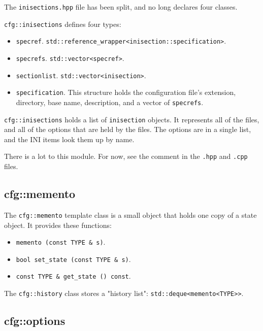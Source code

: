    The \texttt{inisections.hpp} file has been split,
   and no long declares four classes.

   \texttt{cfg::inisections} defines four types:

   \begin{itemize}
      \item \texttt{specref}.
          \texttt{std::reference\_wrapper<inisection::specification>}.
      \item \texttt{specrefs}.
          \texttt{std::vector<specref>}.
      \item \texttt{sectionlist}.
         \texttt{std::vector<inisection>}.
      \item \texttt{specification}.
         This structure holds the configuration file's extension,
         directory, base name, description, and a vector of
         \texttt{specrefs}.
   \end{itemize}

   \texttt{cfg::inisections} holds a list of \texttt{inisection} objects.
   It represents all of the files, and all of
   the options that are held by the files.
   The options are in a single list,
   and the INI items look them up by name.

   There is a lot to this module.
   For now, see the comment in the \texttt{.hpp} and \texttt{.cpp} files.

\subsection{cfg::memento}
\label{subsec:cfg_namespace_memento}

   The \texttt{cfg::memento} template class is a small object that holds one
   copy of a state object.
   It provides these functions:

   \begin{itemize}
      \item \texttt{memento (const TYPE \& s)}.
      \item \texttt{bool set\_state (const TYPE \& s)}.
      \item \texttt{const TYPE \& get\_state () const}.
   \end{itemize}

   The \texttt{cfg::history} class stores a "history list":
   \texttt{std::deque<memento<TYPE>>}.

\subsection{cfg::options}
\label{subsec:cfg_namespace_options}

